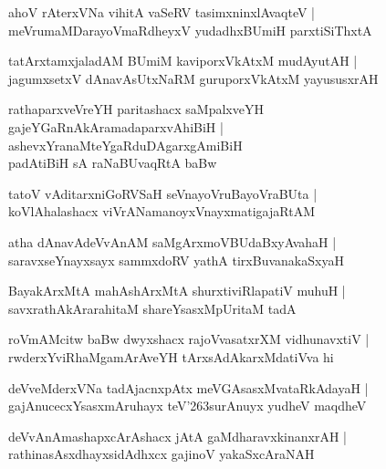 \documentclass[twoside,12pt,openright]{book}
\def\S{\char'263}
\newcounter{shloka}[chapter]
\begin{document}
\begin{shloka}%
ahoV rAterxVNa vihitA vaSeRV tasimxninxlAvaqteV |\\
meVrumaMDarayoVmaRdheyxV yudadhxBUmiH parxtiSiThxtA
\end{shloka}

\begin{shloka}%
tatArxtamxjaladAM BUmiM kaviporxVkAtxM mudAyutAH |\\
jagumxsetxV dAnavAsUtxNaRM guruporxVkAtxM yayususxrAH 
\end{shloka}

\begin{shloka}%
rathaparxveVreYH paritashacx saMpalxveYH \\
gajeYGaRnAkAramadaparxvAhiBiH |\\
ashevxYranaMteYgaRduDAgarxgAmiBiH \\
padAtiBiH sA raNaBUvaqRtA baBw
\end{shloka}

\begin{shloka}%
tatoV vAditarxniGoRVSaH seVnayoVruBayoVraBUta |\\
koVlAhalashacx viVrANamanoyxVnayxmatigajaRtAM 
\end{shloka}

\begin{shloka}%
atha dAnavAdeVvAnAM saMgArxmoVBUdaBxyAvahaH |\\
saravxseYnayxsayx sammxdoRV yathA tirxBuvanakaSxyaH 
\end{shloka}

\begin{shloka}%
BayakArxMtA mahAshArxMtA shurxtiviRlapatiV muhuH |\\
savxrathAkArarahitaM shareYsasxMpUritaM tadA 
\end{shloka}

\begin{shloka}%
roVmAMcitw baBw dwyxshacx rajoVvasatxrXM vidhunavxtiV |\\
rwderxYviRhaMgamArAveYH tArxsAdAkarxMdatiVva hi
\end{shloka}

\begin{shloka}%
deVveMderxVNa tadAjacnxpAtx meVGAsasxMvataRkAdayaH |\\
gajAnucecxYsasxmAruhayx teV\S surAnuyx yudheV maqdheV 
\end{shloka}

\begin{shloka}%
deVvAnAmashapxcArAshacx jAtA gaMdharavxkinanxrAH |\\
rathinasAsxdhayxsidAdhxcx gajinoV yakaSxcAraNAH 
\end{shloka}
\end{document}
